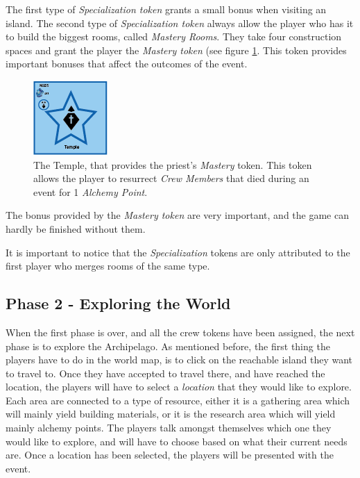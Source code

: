 The first type of \textit{Specialization token} grants a small bonus when visiting an island. The second type of \textit{Specialization token} always allow the player who has it to build the biggest rooms, called \textit{Mastery Rooms}. They take four construction spaces and grant the player the \textit{Mastery token} (see figure \ref{fig:temp}. This token provides important bonuses that affect the outcomes of the event.
 
\begin{figure}[!ht]
    \centering
    \includegraphics[scale=1]{Images/mastery.png}
    \caption{The Temple, that provides the priest's \textit{Mastery} token. This token allows the player to resurrect \textit{Crew Members} that died during an event for 1 \textit{Alchemy Point}.}
    \label{fig:temp}
\end{figure}

The bonus provided by the \textit{Mastery token} are very important, and the game can hardly be finished without them.

It is important to notice that the \textit{Specialization} tokens are only attributed to the first player who merges rooms of the same type. 
\subsection{Phase 2 - Exploring the World}
\label{sec:p2}
When the first phase is over, and all the crew tokens have been assigned, the next phase is to explore the Archipelago.
As mentioned before, the first thing the players have to do in the world map, is to click on the reachable island they want to travel to. Once they have accepted to travel there, and have reached the location, the players will have to select a \textit{location} that they would like to explore.
Each area are connected to a type of resource, either it is a gathering area which will mainly yield building materials, or it is the research area which will yield mainly alchemy points. The players talk amongst themselves which one they would like to explore, and will have to choose based on what their current needs are. Once a location has been selected, the players will be presented with the event.

